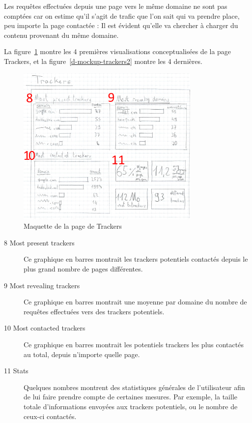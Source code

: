 			Les requêtes effectuées depuis une page vers le même domaine ne sont pas comptées car on estime qu'il s'agit de trafic que l'on sait qui va prendre place, peu importe la page contactée : Il est évident qu'elle va chercher à charger du contenu provenant du même domaine.
			
			La figure~\ref{d-mockup-trackers1} montre les 4 premières visualisations conceptualisées de la page Trackers, et la figure~\ref{d-mockup-trackers2} montre les 4 dernières.

			\begin{figure}[!h]
				\centering
				\includegraphics[width=0.8\textwidth]{images/design/mockup_trackers1}
				\caption{Maquette de la page de Trackers}
				\label{d-mockup-trackers1}
			\end{figure}

			\begin{description}
				\item[8 Most present trackers] Ce graphique en barres montrait les trackers potentiels contactés depuis  le plus grand nombre de pages différentes.
				\item[9 Most revealing trackers] Ce graphique en barres montrait une moyenne par domaine du nombre de requêtes effectuées vers des trackers potentiels.
				\item[10 Most contacted trackers] Ce graphique en barres montrait les potentiels trackers les plus contactés au total, depuis n'importe quelle page.
				\item[11 Stats] Quelques nombres montrent des statistiques générales de l'utilisateur afin de lui faire prendre compte de certaines mesures. Par exemple, la taille totale d'informations envoyées aux trackers potentiels, ou le nombre de ceux-ci contactés.
			\end{description}


